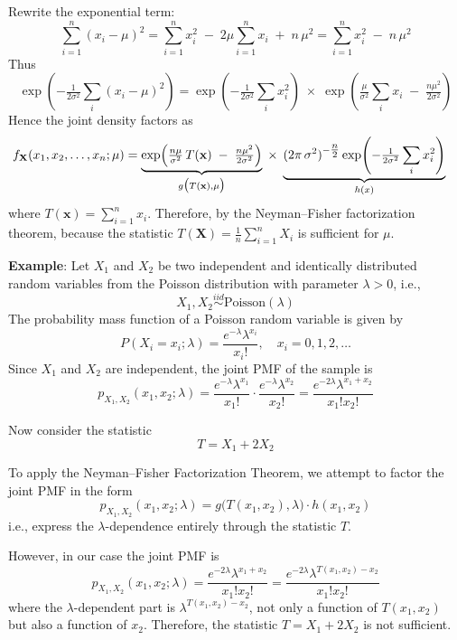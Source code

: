\documentclass[twoside]{book}
\begin{document}
\begin{enumerate}
    Rewrite the exponential term:
    \[
    \sum_{i=1}^n (x_i - \mu)^2
    =
    \sum_{i=1}^n x_i^2
    \;-\;2\mu\sum_{i=1}^n x_i
    \;+\;n\,\mu^2 = \sum_{i=1}^n x_i^2\;-\;n\,\mu^2
    \]
    Thus
    \[
    \exp\!\left( -\tfrac{1}{2\sigma^2}\sum_i (x_i - \mu)^2\right)
    =
    \exp\!\left( -\tfrac{1}{2\sigma^2}\sum_i x_i^2\right)
    \;\times\;
    \exp\!\left( \tfrac{\mu}{\sigma^2}\sum_i x_i \;-\;\tfrac{n\mu^2}{2\sigma^2}\right)
    \]
    Hence the joint density factors as
    \[
    \begin{aligned}
    f_{\textbf{X}}(x_1,x_2,\dots,x_n ; \mu)
    &=
    \underbrace{%
    \exp\!\left( \tfrac{n\mu}{\sigma^2}\,T(\textbf{x})
         \;-\;\tfrac{n\mu^2}{2\sigma^2}\right)
    }_{g\bigl(T(\textbf{x}),\mu\bigr)}
    \;\times\;
    \underbrace{%
    (2\pi\,\sigma^2)^{-\tfrac{n}{2}}
    \exp\!\left( -\tfrac{1}{2\sigma^2}\sum_i x_i^2\right)
    }_{h(x)}
    \end{aligned}
    \]
    where \(T(\textbf{x})=\sum_{i=1}^n x_i\). Therefore, by the Neyman–Fisher factorization theorem, because the statistic
    \(\displaystyle T(\mathbf{X})=\frac{1}{n}\sum_{i=1}^n X_i\) is sufficient for \(\mu\).

    \bigskip

    \textbf{Example}: Let \( X_1 \) and \( X_2 \) be two independent and identically distributed random variables from the Poisson distribution with parameter \(\lambda > 0\), i.e.,
    \[
    X_1, X_2 \overset{iid}{\sim} \text{Poisson}(\lambda)
    \]
    The probability mass function of a Poisson random variable is given by
    \[
    P(X_i = x_i; \lambda) = \frac{e^{-\lambda} \lambda^{x_i}}{x_i!}, \quad x_i = 0, 1, 2, \dots
    \]
    Since \(X_1\) and \(X_2\) are independent, the joint PMF of the sample is
    \[
    p_{X_1,X_2}(x_1, x_2 ; \lambda) = \frac{e^{-\lambda} \lambda^{x_1}}{x_1!} \cdot \frac{e^{-\lambda} \lambda^{x_2}}{x_2!}
    = \frac{e^{-2\lambda} \lambda^{x_1 + x_2}}{x_1! x_2!}
    \]

    Now consider the statistic
    \[
    T = X_1 + 2X_2
    \]

    To apply the Neyman–Fisher Factorization Theorem, we attempt to factor the joint PMF in the form
    \[
    p_{X_1,X_2}(x_1, x_2 ; \lambda) = g\bigl(T(x_1, x_2), \lambda\bigr) \cdot h(x_1, x_2)
    \]
    i.e., express the \(\lambda\)-dependence entirely through the statistic \(T\).

    However, in our case the joint PMF is
    \[
    p_{X_1,X_2}(x_1, x_2 ; \lambda) = \frac{e^{-2\lambda} \lambda^{x_1 + x_2}}{x_1! x_2!} = \frac{e^{-2\lambda} \lambda^{T(x_1, x_2) - x_2}}{x_1! x_2!}
    \]
    where the \(\lambda\)-dependent part is \(\lambda^{T(x_1, x_2) - x_2}\), not only a function of $T(x_1, x_2)$ but also a function of $x_2$.
    Therefore, the statistic \(T = X_1 + 2X_2\) is not sufficient.


\end{enumerate}
\end{document}
